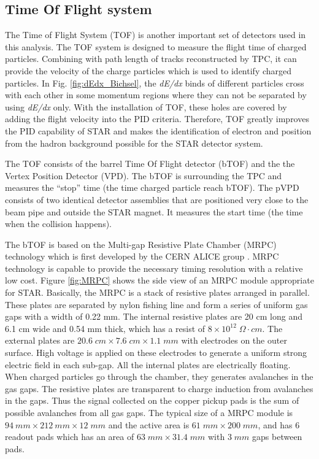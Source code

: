 \subsection{Time Of Flight system}

The Time of Flight System (TOF) is another important set of detectors
used in this analysis. The TOF system is designed to measure the flight
time of charged particles. Combining with path length of tracks reconstructed
by TPC, it can provide the velocity of the charge particles which
is used to identify charged particles. In Fig. \ref{fig:dEdx_Bichsel},
the \emph{dE/dx} binds of different particles cross with each other
in some momentum regions where they can not be separated by using\emph{
dE/dx }only. With the installation of TOF, these holes are covered
by adding the flight velocity into the PID criteria. Therefore, TOF
greatly improves the PID capability of STAR and makes the identification
of electron and position from the hadron background possible for the
STAR detector system.

The TOF consists of the barrel Time Of Flight detector (bTOF) \cite{https://drupal.star.bnl.gov/STAR/files/future/proposals/tof-5-24-2004.pdf:kq}
and the the Vertex Position Detector (VPD). The bTOF is surrounding
the TPC and measures the ``stop'' time (the time charged particle
reach bTOF). The pVPD consists of two identical detector assemblies
that are positioned very close to the beam pipe and outside the STAR
magnet. It measures the start time (the time when the collision happens). 

The bTOF is based on the Multi-gap Resistive Plate Chamber (MRPC)
technology which is first developed by the CERN ALICE group \cite{CerronZeballos1996132}.
MRPC technology is capable to provide the necessary timing resolution
with a relative low cost. Figure \ref{fig:MRPC} shows the side view
of an MRPC module appropriate for STAR. Basically, the MRPC is a stack
of resistive plates arranged in parallel. These plates are separated
by nylon fishing line and form a series of uniform gas gaps with a
width of 0.22 mm. The internal resistive plates are 20 cm long and
6.1 cm wide and 0.54 mm thick, which has a resist of $8\times10^{12}\;\Omega\cdot cm$.
The external plates are $20.6\; cm\times7.6\; cm\times1.1\; mm$ with
electrodes on the outer surface. High voltage is applied on these
electrodes to generate a uniform strong electric field in each sub-gap.
All the internal plates are electrically floating. When charged particles
go through the chamber, they generates avalanches in the gas gaps.
The resistive plates are transparent to charge induction from avalanches
in the gaps. Thus the signal collected on the copper pickup pads is
the sum of possible avalanches from all gas gaps. The typical size
of a MRPC module is $94\: mm\times212\: mm\times12\; mm$ and the
active area is $61\; mm\times200\; mm$, and has 6 readout pads which
has an area of $63\; mm\times31.4\; mm$ with $3\; mm$ gaps between
pads.

